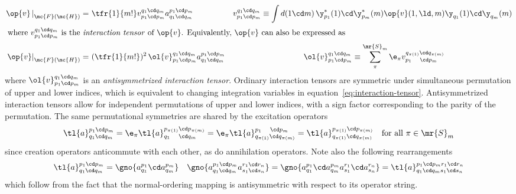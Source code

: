 \begin{ntt}
\begin{align}
  \left.
  \op{v}\,
  \right|_{\mc{F}(\mc{H})}
=&\
  \tfr{1}{m!}
  v_{p_1\cd p_m}^{q_1\cd q_m}
  a^{p_1\cd p_m}_{q_1\cd q_m}
&
  v_{p_1\cd p_m}^{q_1\cd q_m}
\equiv
  \int
  d(1\cd m)\,
  \y_{p_1}^*(1)\cd \y_{p_m}^*(m)
  \op{v}(1,\ld,m)
  \y_{q_1}(1)\cd \y_{q_m}(m)
&
\\
\intertext{
where $v_{p_1\cd p_m}^{q_1\cd q_m}$ is the \textit{interaction tensor} of $\op{v}$.
Equivalently, $\op{v}$ can also be expressed as
}
\label{eq:antisymmetrized-interaction-tensor}
  \left.
  \op{v}
  \right|_{\mc{F}(\mc{H})}
=&\
  (\tfr{1}{m!})^2\,
  \ol{v}_{p_1\cd p_m}^{q_1\cd q_m}
  a^{p_1\cd p_m}_{q_1\cd q_m}
&
  \ol{v}_{p_1\cd p_m}^{q_1\cd q_m}
\equiv
  \sum_\pi^{\mr{S}_m}
  \e_\pi
  v_{p_1\hphantom{_{\pi()}}\cd p_m}^{q_{\pi(1)}\cd q_{\pi(m)}}
\hspace{3cm}&
\end{align}
where $\ol{v}_{p_1\cd p_m}^{q_1\cd q_m}$ is an \textit{antisymmetrized interaction tensor}.
Ordinary interaction tensors are symmetric under simultaneous permutation of upper and lower indices, which is equivalent to changing integration variables in equation~\ref{eq:interaction-tensor}.
Antisymmetrized interaction tensors allow for independent permutations of upper and lower indices, with a sign factor corresponding to the parity of the permutation.
The same permutational symmetries are shared by the excitation operators
\begin{align}\label{eq:excitation-permutational-symmetries-1}
  \tl{a}^{p_1\cd p_m}_{q_1\cd q_m}
=
  \e_{\pi}
  \tl{a}^{p_{\pi(1)}\cd p_{\pi(m)}}_{q_1\hphantom{_{\pi()}}\cd q_m}
=
  \e_{\pi}
  \tl{a}^{p_1\hphantom{_{\pi()}}\cd p_m}_{q_{\pi(1)}\cd q_{\pi(m)}}
=
  \tl{a}^{p_{\pi(1)}\cd p_{\pi(m)}}_{q_{\pi(1)}\cd q_{\pi(m)}}
&&
  \text{for all $\pi\in\mr{S}_m$}
\end{align}
since creation operators anticommute with each other, as do annihilation operators.
Note also the following rearrangements
\begin{align}\label{eq:excitation-permutational-symmetries-2}
  \tl{a}^{p_1\cd p_m}_{q_1\cd q_m}
=
  \gno{a^{p_1}_{q_1}\cd a^{p_m}_{q_m}}
&&
  \gno{a^{p_1\cd p_m}_{q_1\cd q_m}a^{r_1\cd r_n}_{s_1\cd s_n}}
=
  \gno{a^{p_1}_{q_1}\cd a^{p_m}_{q_m}a^{r_1}_{s_1}\cd a^{r_n}_{s_n}}
=
  \tl{a}^{p_1\cd p_mr_1\cd r_n}_{q_1\cd q_ms_1\cd s_n}
\end{align}
which follow from the fact that the normal-ordering mapping is antisymmetric with respect to its operator string.
\end{ntt}


